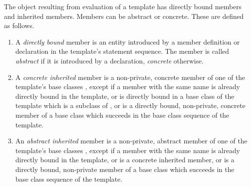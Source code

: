 \documentclass[11pt]{report}
\newcommand{\ifqualified}[1]{}
\begin{document}
\label{sec:members}

The object resulting from evaluation of a template has directly bound
members and inherited members. Members can be abstract or concrete.
These are defined as follows.
\begin{enumerate}
\item
A {\em directly bound} member is an entity introduced by a member
definition or declaration in the template's statement sequence. The
member is called {\em abstract} if it is introduced by a declaration,
{\em concrete} otherwise.
\item
A {\em concrete inherited} member is a non-private, concrete member of
one of the template's base classes \verb@B@, except if a member with the
same \ifqualified{qualified} name is already directly bound in the template, or is
directly bound in a base class of the template which is a subclass of
\verb@B@, or is a directly bound, non-private, concrete member of a base
class which succeeds \verb@B@ in the base class sequence of the template.
\item
An {\em abstract inherited} member is a non-private, abstract member
of one of the template's base classes \verb@B@, except if a member with the
same \ifqualified{qualified} name is already directly bound in the template, or is a
concrete inherited member, or is a directly bound, non-private member
of a base class which succeeds \verb@b@ in the base class sequence of the
template.
\end{enumerate}
\end{document}
